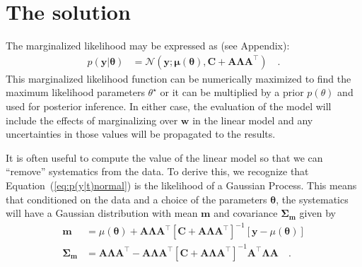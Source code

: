 \documentclass[modern]{rnaastex}
\renewcommand{\eqref}[1]{\ref{eq:#1}}
\newcommand{\Eq}[1]{Equation~(\eqref{#1})}
\newcommand{\eq}[1]{\Eq{#1}}
\newcommand{\eqlabel}[1]{\label{eq:#1}}
\newcommand{\bvec}[1]{{\ensuremath{\boldsymbol{#1}}}}
\newcommand{\Normal}{\ensuremath{\mathcal{N}}}
\newcommand{\mA}{\ensuremath{\bvec{A}}}
\newcommand{\mC}{\ensuremath{\bvec{C}}}
\newcommand{\mL}{\ensuremath{\bvec{\Lambda}}}
\newcommand{\vy}{\ensuremath{\bvec{y}}}
\newcommand{\vt}{\ensuremath{\bvec{\theta}}}
\newcommand{\vm}{\ensuremath{\bvec{\mu}(\bvec{\theta})}}
\begin{document}
\section{The solution}

The marginalized likelihood may be expressed as (see Appendix):
%
\begin{align}
\eqlabel{p(y|t)normal}
p(\vy | \vt) &= \Normal (\vy; \vm, \mC + \mA \mL \mA^\top) \quad.
\end{align}
%
This marginalized likelihood function can be numerically maximized to find the
maximum likelihood parameters $\theta^\star$ or it can be
multiplied by a prior $p(\theta)$ and used for posterior inference.
In either case, the evaluation of the model will include the effects of
marginalizing over $\bvec{w}$ in the linear model and any uncertainties in
those values will be propagated to the results.

It is often useful to compute the value of the linear model so that we can
``remove'' systematics from the data.
To derive this, we recognize that \eq{p(y|t)normal} is the likelihood of a
Gaussian Process.
This means that conditioned on the data and a choice of the parameters
$\bvec{\theta}$, the systematics will have a Gaussian distribution with mean
$\bvec{m}$ and covariance $\bvec{\Sigma}_\bvec{m}$ given by
\citep{Rasmussen:2006}
%
\begin{align}\eqlabel{pred}
\bvec{m} &= \mu(\bvec{\theta}) + \mA \mL \mA^\top  \left[\mC +
    \mA \mL \mA^\top\right]^{-1} \left[\bvec{y} - \mu(\bvec{\theta})\right]
    \nonumber\\
\bvec{\Sigma}_\bvec{m} &= \mA \mL \mA^\top - \mA \mL \mA^\top
    \left[\mC + \mA \mL \mA^\top\right]^{-1}
    \mA^\top \mL \mA \quad.
\end{align}
\end{document}
